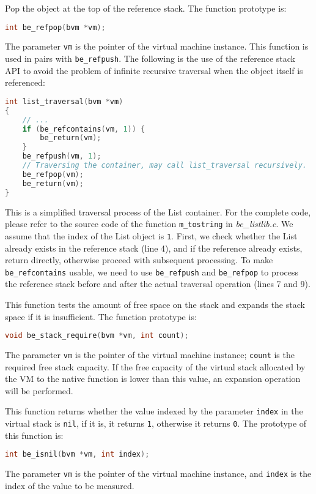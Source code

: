 Pop the object at the top of the reference stack. The function prototype is:
\begin{lstlisting}[language=c, style=berry, numbers=none]
int be_refpop(bvm *vm);
\end{lstlisting}
The parameter \texttt{vm} is the pointer of the virtual machine instance. This function is used in pairs with \texttt{be\_refpush}. The following is the use of the reference stack API to avoid the problem of infinite recursive traversal when the object itself is referenced:
\begin{lstlisting}[language=c, style=berry]
int list_traversal(bvm *vm)
{
    // ...
    if (be_refcontains(vm, 1)) {
        be_return(vm);
    }
    be_refpush(vm, 1);
    // Traversing the container, may call list_traversal recursively.
    be_refpop(vm);
    be_return(vm);
}
\end{lstlisting}
This is a simplified traversal process of the List container. For the complete code, please refer to the source code of the function \texttt{m\_tostring} in \textsl{be\_listlib.c}. We assume that the index of the List object is \texttt{1}. First, we check whether the List already exists in the reference stack (line 4), and if the reference already exists, return directly, otherwise proceed with subsequent processing. To make \texttt{be\_refcontains} usable, we need to use \texttt{be\_refpush} and \texttt{be\_refpop} to process the reference stack before and after the actual traversal operation (lines 7 and 9).


This function tests the amount of free space on the stack and expands the stack space if it is insufficient. The function prototype is:
\begin{lstlisting}[language=c, style=berry, numbers=none]
void be_stack_require(bvm *vm, int count);
\end{lstlisting}
The parameter \texttt{vm} is the pointer of the virtual machine instance; \texttt{count} is the required free stack capacity. If the free capacity of the virtual stack allocated by the VM to the native function is lower than this value, an expansion operation will be performed.


This function returns whether the value indexed by the parameter \texttt{index} in the virtual stack is \texttt{nil}, if it is, it returns \texttt{1}, otherwise it returns \texttt{0}. The prototype of this function is:
\begin{lstlisting}[language=c, style=berry, numbers=none]
int be_isnil(bvm *vm, int index);
\end{lstlisting}
The parameter \texttt{vm} is the pointer of the virtual machine instance, and \texttt{index} is the index of the value to be measured.

